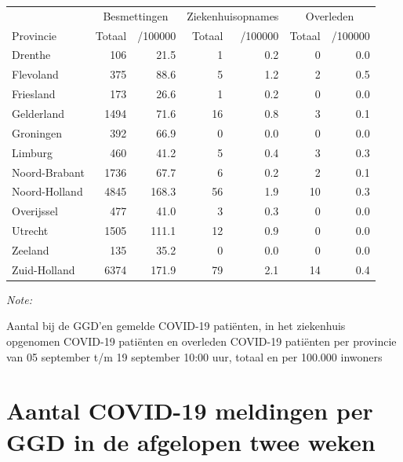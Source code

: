 \documentclass[
  english,
  man,floatsintext]{apa6}
\begin{document}
\begin{table}[H]
\centering
\begin{threeparttable}
\begin{tabular}{lrrrrrr}
\toprule
\multicolumn{1}{c}{ } & \multicolumn{2}{c}{Besmettingen} & \multicolumn{2}{c}{Ziekenhuisopnames} & \multicolumn{2}{c}{Overleden} \\
\cmidrule(l{3pt}r{3pt}){2-3} \cmidrule(l{3pt}r{3pt}){4-5} \cmidrule(l{3pt}r{3pt}){6-7}
Provincie & Totaal & /100000 & Totaal & /100000 & Totaal & /100000\\
\midrule
Drenthe & 106 & 21.5 & 1 & 0.2 & 0 & 0.0\\
Flevoland & 375 & 88.6 & 5 & 1.2 & 2 & 0.5\\
Friesland & 173 & 26.6 & 1 & 0.2 & 0 & 0.0\\
Gelderland & 1494 & 71.6 & 16 & 0.8 & 3 & 0.1\\
Groningen & 392 & 66.9 & 0 & 0.0 & 0 & 0.0\\
Limburg & 460 & 41.2 & 5 & 0.4 & 3 & 0.3\\
Noord-Brabant & 1736 & 67.7 & 6 & 0.2 & 2 & 0.1\\
Noord-Holland & 4845 & 168.3 & 56 & 1.9 & 10 & 0.3\\
Overijssel & 477 & 41.0 & 3 & 0.3 & 0 & 0.0\\
Utrecht & 1505 & 111.1 & 12 & 0.9 & 0 & 0.0\\
Zeeland & 135 & 35.2 & 0 & 0.0 & 0 & 0.0\\
Zuid-Holland & 6374 & 171.9 & 79 & 2.1 & 14 & 0.4\\
\bottomrule
\end{tabular}
\begin{tablenotes}
\item \textit{Note: } 
\item Aantal bij de GGD’en gemelde COVID-19 patiënten, in het ziekenhuis opgenomen COVID-19 patiënten en overleden COVID-19 patiënten per provincie van 05 september t/m 19 september 10:00 uur, totaal en per 100.000 inwoners
\end{tablenotes}
\end{threeparttable}
\end{table}

\newpage

\hypertarget{aantal-covid-19-meldingen-per-ggd-in-de-afgelopen-twee-weken}{%
\section{Aantal COVID-19 meldingen per GGD in de afgelopen twee weken}\label{aantal-covid-19-meldingen-per-ggd-in-de-afgelopen-twee-weken}}
\end{document}
